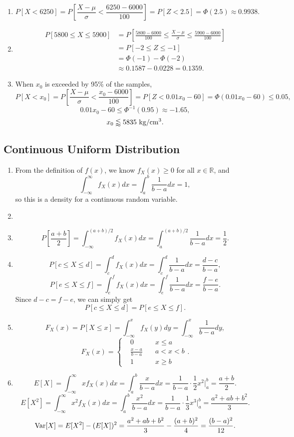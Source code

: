 \documentclass[11pt,a4paper]{article}
\begin{document}
\begin{enumerate}[label=\roman*)]
\item
$$P[X<6250]=P\left[\frac{X-\mu}{\sigma}<\frac{6250-6000}{100}\right]=P[Z<2.5]=\Phi(2.5)\approx0.9938.$$
\item
\begin{align*}
P[5800\leqslant X\leqslant 5900]&=P\left[\frac{5800-6000}{100}\leqslant\frac{X-\mu}{\sigma}\leqslant\frac{5900-6000}{100}\right]\\
&=P[-2\leqslant Z\leqslant -1]\\
&=\Phi(-1)-\Phi(-2)\\
&\approx0.1587-0.0228=0.1359.
\end{align*}
\item
When $x_0$ is exceeded by 95\% of the samples,
$$P[X<x_0]=P\left[\frac{X-\mu}{\sigma}<\frac{x_0-6000}{100}\right]=P[Z<0.01x_0-60]=\Phi(0.01x_0-60)\leqslant 0.05,$$
$$0.01x_0-60\leqslant\Phi^{-1}(0.95)\approx-1.65,$$
$$x_0\lessapprox5835{\rm~kg/cm^3}.$$
\end{enumerate}

\subsection{Continuous Uniform Distribution}

\begin{enumerate}[label=\roman*)]
\item
From the definition of $f(x)$, we know $f_X(x)\geqslant0$ for all $x\in\mathbb{R}$, and
$$\int_{-\infty}^\infty f_X(x)dx=\int_a^b\frac{1}{b-a}dx=1,$$
so this is a density for a continuous random variable.
\item

\item
$$P\left[\frac{a+b}{2}\right]=\int_{-\infty}^{(a+b)/2}f_X(x)dx=\int_a^{(a+b)/2}\frac{1}{b-a}dx=\frac{1}{2}.$$
\item
$$P[c\leqslant X\leqslant d]=\int_c^df_X(x)dx=\int_c^d\frac{1}{b-a}dx=\frac{d-c}{b-a},$$
$$P[e\leqslant X\leqslant f]=\int_e^ff_X(x)dx=\int_e^f\frac{1}{b-a}dx=\frac{f-e}{b-a}.$$
Since $d-c=f-e$, we can simply get
$$P[c\leqslant X\leqslant d]=P[e\leqslant X\leqslant f].$$
\item
$$F_X(x)=P[X\leqslant x]=\int_{-\infty}^xf_X(y)dy=\int_{-\infty}^x\frac{1}{b-a}dy,$$
$$F_X(x)=\left\{\begin{aligned}
&0&\quad x\leqslant a\\
&\frac{x-a}{b-a}&\quad a<x<b\\
&1&\quad x\geqslant b
\end{aligned}\right..$$
\item
$$E[X]=\int_{-\infty}^\infty xf_X(x)dx=\int_a^b\frac{x}{b-a}dx=\frac{1}{b-a}\cdot\frac{1}{2}x^2\bigg|_a^b=\frac{a+b}{2}.$$
$$E[X^2]=\int_{-\infty}^\infty x^2f_X(x)dx=\int_a^b\frac{x^2}{b-a}dx=\frac{1}{b-a}\cdot\frac{1}{3}x^3\bigg|_a^b=\frac{a^2+ab+b^2}{3}.$$
$${\rm Var}[X]=E[X^2]-(E[X])^2=\frac{a^2+ab+b^2}{3}-\frac{(a+b)^2}{4}=\frac{(b-a)^2}{12}.$$
\end{enumerate}
\end{document}
